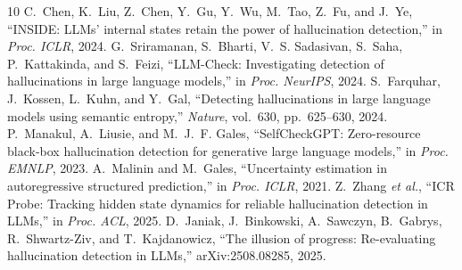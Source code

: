 \documentclass[journal]{IEEEtran}
\begin{document}
\begin{thebibliography}{10}
 C.~Chen, K.~Liu, Z.~Chen, Y.~Gu, Y.~Wu, M.~Tao, Z.~Fu, and J.~Ye, ``INSIDE: LLMs' internal states retain the power of hallucination detection,'' in \emph{Proc. ICLR}, 2024.
 G.~Sriramanan, S.~Bharti, V.~S. Sadasivan, S.~Saha, P.~Kattakinda, and S.~Feizi, ``LLM-Check: Investigating detection of hallucinations in large language models,'' in \emph{Proc. NeurIPS}, 2024.
 S.~Farquhar, J.~Kossen, L.~Kuhn, and Y.~Gal, ``Detecting hallucinations in large language models using semantic entropy,'' \emph{Nature}, vol.~630, pp.~625--630, 2024.
 P.~Manakul, A.~Liusie, and M.~J.~F. Gales, ``SelfCheckGPT: Zero-resource black-box hallucination detection for generative large language models,'' in \emph{Proc. EMNLP}, 2023.
 A.~Malinin and M.~Gales, ``Uncertainty estimation in autoregressive structured prediction,'' in \emph{Proc. ICLR}, 2021.
 Z.~Zhang \emph{et al.}, ``ICR Probe: Tracking hidden state dynamics for reliable hallucination detection in LLMs,'' in \emph{Proc. ACL}, 2025.
 D.~Janiak, J.~Binkowski, A.~Sawczyn, B.~Gabrys, R.~Shwartz-Ziv, and T.~Kajdanowicz, ``The illusion of progress: Re-evaluating hallucination detection in LLMs,'' arXiv:2508.08285, 2025.
\end{thebibliography}
\end{document}
